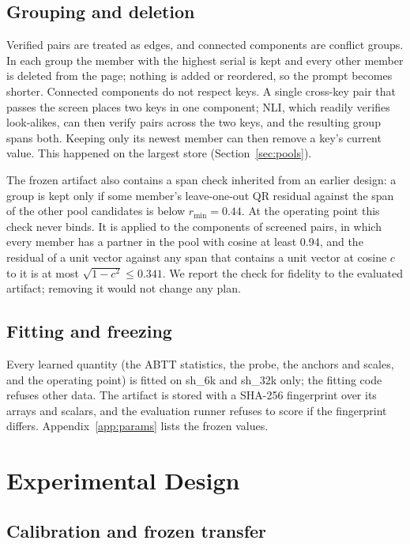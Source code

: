 \documentclass[journal=jcisd8,manuscript=article]{achemso}
\newcommand{\sub}[1]{\textsf{sh\_#1}}                    %
\begin{document}
\subsection{Grouping and deletion}
\label{sec:group}

Verified pairs are treated as edges, and connected components are conflict groups. In each group the member with the highest serial is kept and every other member is deleted from the page; nothing is added or reordered, so the prompt becomes shorter. Connected components do not respect keys. A single cross-key pair that passes the screen places two keys in one component; NLI, which readily verifies look-alikes, can then verify pairs across the two keys, and the resulting group spans both. Keeping only its newest member can then remove a key's current value. This happened on the largest store (Section~\ref{sec:pools}).

The frozen artifact also contains a span check inherited from an earlier design: a group is kept only if some member's leave-one-out QR residual against the span of the other pool candidates is below $r_{\min}=0.44$. At the operating point this check never binds. It is applied to the components of screened pairs, in which every member has a partner in the pool with cosine at least 0.94, and the residual of a unit vector against any span that contains a unit vector at cosine $c$ to it is at most $\sqrt{1-c^{2}}\le0.341$. We report the check for fidelity to the evaluated artifact; removing it would not change any plan.

\subsection{Fitting and freezing}
\label{sec:freeze}

Every learned quantity (the ABTT statistics, the probe, the anchors and scales, and the operating point) is fitted on \sub{6k} and \sub{32k} only; the fitting code refuses other data. The artifact is stored with a SHA-256 fingerprint over its arrays and scalars, and the evaluation runner refuses to score if the fingerprint differs. Appendix~\ref{app:params} lists the frozen values.

\section{Experimental Design}
\label{sec:design}

\subsection{Calibration and frozen transfer}
\label{sec:splits}
\end{document}
